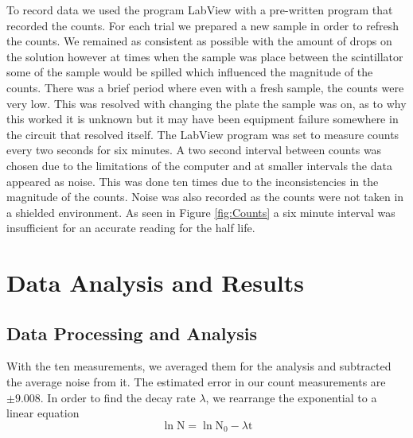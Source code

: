 \documentclass[11pt,letterpaper,onecolumn]{article}
\begin{document}
 To record data we used the program LabView with a pre-written program that recorded the counts. For each trial we prepared a new sample in order to refresh the counts. We remained as consistent as possible with the amount of drops on the solution however at times when the sample was place between the scintillator some of the sample would be spilled which influenced the magnitude of the counts. There was a brief period where even with a fresh sample, the counts were very low. This was resolved with changing the plate the sample was on, as to why this worked it is unknown but it may have been equipment failure somewhere in the circuit that resolved itself. The LabView program was set to measure counts every two seconds for six minutes. A two second interval between counts was chosen due to the limitations of the computer and at smaller intervals the data appeared as noise. This was done ten times due to the inconsistencies in the magnitude of the counts. Noise was also recorded as the counts were not taken in a shielded environment. As seen in Figure \ref{fig:Counts} a six minute interval was insufficient for an accurate reading for the half life.   
  
 
 


\section{Data Analysis and Results}

\subsection{Data Processing and Analysis}

With the ten measurements, we averaged them for the analysis and subtracted the average noise from it. The estimated error in our count measurements are $\pm9.008$. In order to find the decay rate $\lambda$, we rearrange the exponential to a linear equation
$$\ln{\text{N}}=\ln{\text{N}_0}-\lambda\text{t}$$
\end{document}
